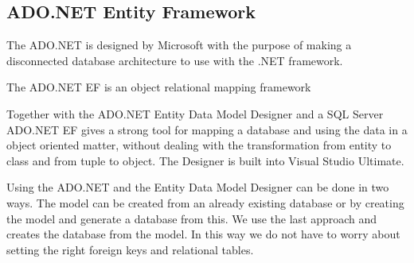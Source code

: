 \subsection{ADO.NET Entity Framework}
\label{sub:adonet}
The ADO.NET is designed by Microsoft with the purpose of making a disconnected database architecture to use with the .NET framework. %

The ADO.NET EF is an object relational mapping framework %

Together with the ADO.NET Entity Data Model Designer and a SQL Server ADO.NET EF gives a strong tool for mapping a database and using the data in a object oriented matter, without dealing with the transformation from entity to class and from tuple to object. 
The Designer is built into Visual Studio Ultimate. 

Using the ADO.NET and the Entity Data Model Designer can be done in two ways. 
The  model can be created from an already existing database or by creating the model and generate a database from this. 
We use the last approach and creates the database from the model. 
In this way we do not have to worry about setting the right foreign keys and relational tables. 








 
 
